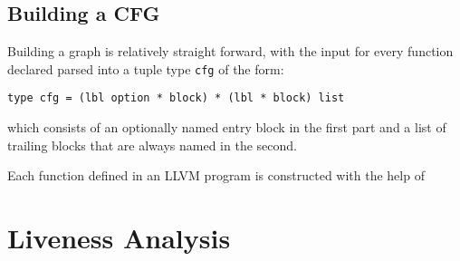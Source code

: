 \documentclass{article}
\begin{document}









\subsection{Building a CFG}




Building a graph is relatively straight forward, with the input for every function declared parsed into a tuple type \texttt{cfg}  of the form:
\begin{center}
\begin{verbatim}
type cfg = (lbl option * block) * (lbl * block) list
\end{verbatim}
\end{center}
which consists of an optionally named entry block in the first part and a list of trailing blocks that are always named in the second.


Each function defined in an LLVM program is constructed with the help of

\section{Liveness Analysis}

%
\end{document}
